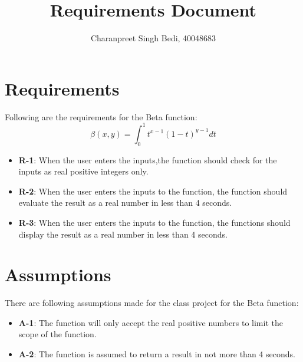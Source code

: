\documentclass[12pt]{article}
\title{Requirements Document}
\author{Charanpreet Singh Bedi, 40048683 }
\date{}
\begin{document}
\maketitle

\section{Requirements}
Following are the requirements for the Beta function:
$$\beta(x,y) =\int_{0}^{1} t^{x-1} (1-t)^{y-1} dt$$
\begin{itemize}
    \item \textbf{R-1}: When the user enters the inputs,the function should check for the inputs as real positive integers only.
    \item \textbf{R-2}: When the user enters the inputs to the function, the function should evaluate the result as a real number in less than 4 seconds.
    \item \textbf{R-3}: When the user enters the inputs to the function, the functions should display the result as a real number in less than 4 seconds.
\end{itemize}

\section{Assumptions}
There are following assumptions made for the class project for the Beta function:
\begin{itemize}
    \item \textbf{A-1}: The function will only accept the real positive numbers to limit the scope of the function.
    \item \textbf{A-2}: The function is assumed to return a result in not more than 4 seconds.
    
\end{itemize}
\end{document}
